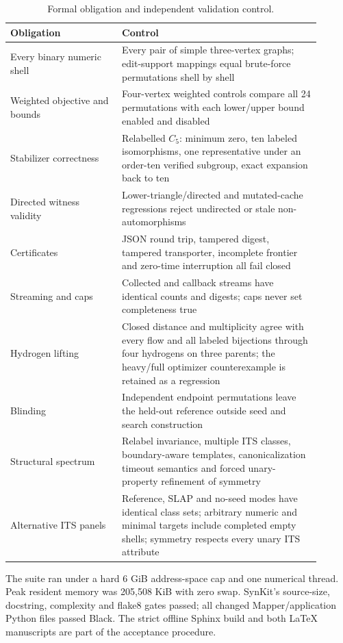 \documentclass[11pt]{article}
\theoremstyle{definition}
\begin{document}
\begin{table}[ht]
\centering
\caption{Formal obligation and independent validation control.}
\begin{tabular}{>{\raggedright\arraybackslash}p{0.32\linewidth}
                >{\raggedright\arraybackslash}p{0.58\linewidth}}
\toprule
Obligation & Control \\
\midrule
Every binary numeric shell & Every pair of simple three-vertex graphs;
edit-support mappings equal brute-force permutations shell by shell \\
Weighted objective and bounds & Four-vertex weighted controls compare all
24 permutations with each lower/upper bound enabled and disabled \\
Stabilizer correctness & Relabelled \(C_5\): minimum zero, ten labeled
isomorphisms, one representative under an order-ten verified subgroup, exact
expansion back to ten \\
Directed witness validity & Lower-triangle/directed and mutated-cache
regressions reject undirected or stale non-automorphisms \\
Certificates & JSON round trip, tampered digest, tampered transporter,
incomplete frontier and zero-time interruption all fail closed \\
Streaming and caps & Collected and callback streams have identical counts and
digests; caps never set completeness true \\
Hydrogen lifting & Closed distance and multiplicity agree with every flow and
all labeled bijections through four hydrogens on three parents; the heavy/full
optimizer counterexample is retained as a regression \\
Blinding & Independent endpoint permutations leave the held-out reference
outside seed and search construction \\
Structural spectrum & Relabel invariance, multiple ITS classes,
boundary-aware templates, canonicalization timeout semantics and forced unary-
property refinement of symmetry \\
Alternative ITS panels & Reference, SLAP and no-seed modes have identical
class sets; arbitrary numeric and minimal targets include completed empty
shells; symmetry respects every unary ITS attribute \\
\bottomrule
\end{tabular}
\end{table}

The suite ran under a hard 6 GiB address-space cap and one numerical thread.
Peak resident memory was 205,508 KiB with zero swap.  SynKit's source-size,
docstring, complexity and flake8 gates passed; all changed Mapper/application
Python files passed Black.  The strict offline Sphinx build and both LaTeX
manuscripts are part of the acceptance procedure.
\end{document}

